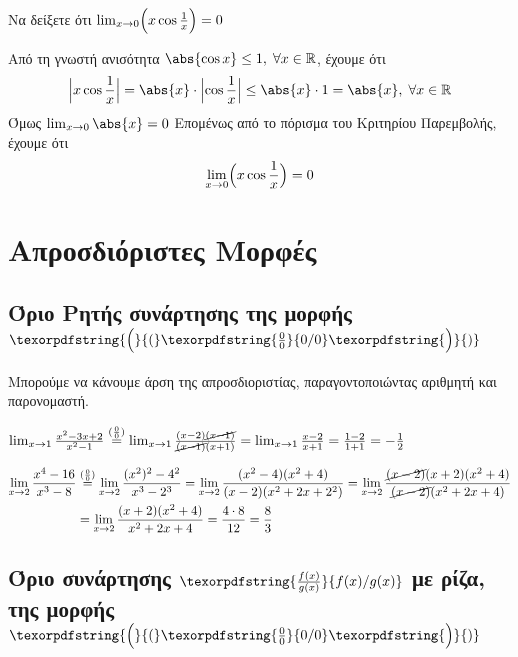 \begin{example}
  Να δείξετε ότι $ \lim_{x \to 0} \Bigl(x \cos{\frac{1}{x}}\Bigr) = 0 $
\end{example}
\begin{solution}
  Από τη γνωστή ανισότητα $ \abs{\cos{x}} \leq 1, \; \forall x \in \mathbb{R} $, 
  έχουμε ότι 
  \[
    \Bigl|x \cos{\frac{1}{x}}\Bigr| = \abs{x} \cdot 
    \Bigl|\cos{\frac{1}{x}}\Bigr| \leq \abs{x} \cdot 1 = 
    \abs{x}, \; \forall x \in \mathbb{R}
  \] 
  Όμως $ \lim_{x \to 0} \abs{x} = 0 $
  Επομένως από το πόρισμα του Κριτηρίου Παρεμβολής, έχουμε ότι 
  \[
    \lim_{x \to 0} \Bigl(x \cos{\frac{1}{x}}\Bigr) = 0 
  \] 
\end{solution}


\section{Απροσδιόριστες Μορφές}


\subsection{Όριο Ρητής συνάρτησης της μορφής
$\texorpdfstring{\Bigl(}{(}\texorpdfstring{\frac{0}{0}}{0/0}\texorpdfstring{\Bigr)}{)} $}

Μπορούμε να κάνουμε άρση της απροσδιοριστίας, παραγοντοποιώντας αριθμητή και παρονομαστή.

\begin{example}
  $ \lim_{x \to 1} \frac{x^{2}-3x+2}{x^{2}-1} \overset{(\frac{0}{0})}{=} \lim_{x \to 1}
  \frac{(x-2)\cancel{(x-1)}}{\cancel{(x-1)}(x+1)} = \lim_{x \to 1} \frac{x-2}{x+1} = 
  \frac{1-2}{1+1} = - \frac{1}{2} $
\end{example}
\begin{example}
  \begin{align*}
    \lim_{x \to 2} \frac{x^{4}-16}{x^{3}-8} 
  &\overset{(\frac{0}{0})}{=} \lim_{x \to 2} \frac{(x^{2})^{2}-4^{2}}{x^{3}-2^{3}} 
  = \lim_{x \to 2} \frac{(x^{2}-4)(x^{2}+4)}{(x-2)(x^{2}+2x+2^{2})} 
  = \lim_{x \to 2} \frac{\cancel{(x-2)}(x+2)(x^{2}+4)}{\cancel{(x-2)}(x^{2}+2x+4)} \\
  &= \lim_{x \to 2} \frac{(x+2)(x^{2}+4)}{x^{2}+2x+4} = \frac{4\cdot 8}{12} = \frac{8}{3} 
  \end{align*}
\end{example}

\subsection{Όριο συνάρτησης $ \texorpdfstring{\frac{f(x)}{g(x)}}{f(x)/g(x)} $ 
με ρίζα, της μορφής $\texorpdfstring{\Bigl(}{(}\texorpdfstring{\frac{0}{0}}{0/0}\texorpdfstring{\Bigr)}{)}$}

